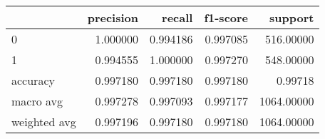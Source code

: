 \begin{tabular}{lrrrr}
\toprule
{} &  precision &    recall &  f1-score &     support \\
\midrule
0            &   1.000000 &  0.994186 &  0.997085 &   516.00000 \\
1            &   0.994555 &  1.000000 &  0.997270 &   548.00000 \\
accuracy     &   0.997180 &  0.997180 &  0.997180 &     0.99718 \\
macro avg    &   0.997278 &  0.997093 &  0.997177 &  1064.00000 \\
weighted avg &   0.997196 &  0.997180 &  0.997180 &  1064.00000 \\
\bottomrule
\end{tabular}
